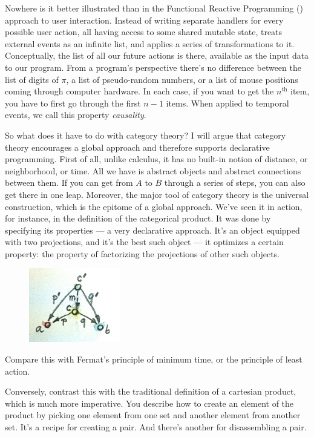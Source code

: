 Nowhere is it better illustrated than in the Functional Reactive
Programming () approach to user interaction. Instead of writing separate
handlers for every possible user action, all having access to some
shared mutable state,  treats external events as an infinite list,
and applies a series of transformations to it. Conceptually, the list of
all our future actions is there, available as the input data to our
program. From a program's perspective there's no difference between the
list of digits of $\pi$, a list of pseudo-random numbers, or a list of mouse
positions coming through computer hardware. In each case, if you want to
get the $n^\text{th}$ item, you have to first go through the first $n-1$ items. When
applied to temporal events, we call this property \emph{causality}.

So what does it have to do with category theory? I will argue that
category theory encourages a global approach and therefore supports
declarative programming. First of all, unlike calculus, it has no
built-in notion of distance, or neighborhood, or time. All we have is
abstract objects and abstract connections between them. If you can get
from $A$ to $B$ through a series of steps, you can also get there in one
leap. Moreover, the major tool of category theory is the universal
construction, which is the epitome of a global approach. We've seen it
in action, for instance, in the definition of the categorical product.
It was done by specifying its properties --- a very declarative
approach. It's an object equipped with two projections, and it's the
best such object --- it optimizes a certain property: the property of
factorizing the projections of other such objects.

\begin{figure}[H]
\centering
\includegraphics[width=1.56250in]{images/productranking.jpg}
\end{figure}

Compare this with Fermat's principle of minimum time, or the principle
of least action.

Conversely, contrast this with the traditional definition of a cartesian
product, which is much more imperative. You describe how to create an
element of the product by picking one element from one set and another
element from another set. It's a recipe for creating a pair. And there's
another for disassembling a pair.

